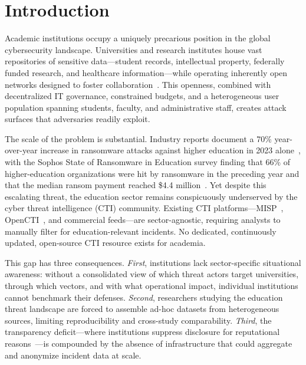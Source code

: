 \documentclass[sigconf,anonymous]{acmart}
\begin{document}

\maketitle

\section{Introduction}\label{sec:intro}

Academic institutions occupy a uniquely precarious position in the global cybersecurity landscape. Universities and research institutes house vast repositories of sensitive data---student records, intellectual property, federally funded research, and healthcare information---while operating inherently open networks designed to foster collaboration~\cite{garrison2011longitudinal}. This openness, combined with decentralized IT governance, constrained budgets, and a heterogeneous user population spanning students, faculty, and administrative staff, creates attack surfaces that adversaries readily exploit.

The scale of the problem is substantial. Industry reports document a 70\% year-over-year increase in ransomware attacks against higher education in 2023 alone~\cite{malwarebytes2024education}, with the Sophos State of Ransomware in Education survey finding that 66\% of higher-education organizations were hit by ransomware in the preceding year and that the median ransom payment reached \$4.4 million~\cite{sophos2024education}. Yet despite this escalating threat, the education sector remains conspicuously underserved by the cyber threat intelligence (CTI) community. Existing CTI platforms---MISP~\cite{wagner2016misp}, OpenCTI~\cite{opencti}, and commercial feeds---are sector-agnostic, requiring analysts to manually filter for education-relevant incidents. No dedicated, continuously updated, open-source CTI resource exists for academia.

This gap has three consequences. \textit{First}, institutions lack sector-specific situational awareness: without a consolidated view of which threat actors target universities, through which vectors, and with what operational impact, individual institutions cannot benchmark their defenses. \textit{Second}, researchers studying the education threat landscape are forced to assemble ad-hoc datasets from heterogeneous sources, limiting reproducibility and cross-study comparability. \textit{Third}, the transparency deficit---where institutions suppress disclosure for reputational reasons~\cite{sophos2024education}---is compounded by the absence of infrastructure that could aggregate and anonymize incident data at scale.
\end{document}

